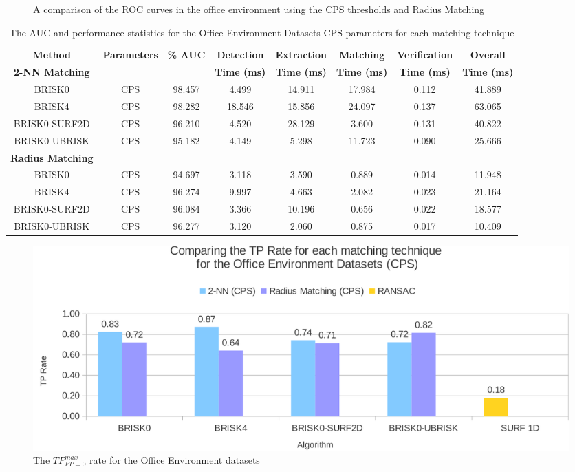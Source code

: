\begin{figure}[ht!]
\begin{minipage}[b]{0.5\linewidth}
\caption{A comparison of the ROC curves in the office environment using the CPS thresholds and Radius Matching}
\label{fig:compareHammingConsistentOffice}
\end{minipage}
\end{figure}

\begin{table}
\centering
\caption{The AUC and performance statistics for the Office Environment Datasets
CPS parameters for each matching technique}

\footnotesize
\begin{tabular}{|c|c|c|c|c|c|c|c|}
\hline 
\textbf{Method } & \textbf{Parameters} & \textbf{\% AUC} & \textbf{Detection} & \textbf{Extraction} & \textbf{Matching} & \textbf{Verification} & \textbf{Overall}\tabularnewline
\textbf{2-NN Matching} &  &  & \textbf{Time (ms)} & \textbf{Time (ms)} & \textbf{Time (ms)} & \textbf{Time (ms)} & \textbf{Time (ms)}\tabularnewline
\hline 
\hline 
BRISK0 & CPS & 98.457 & 4.499 & 14.911 & 17.984 & 0.112 & 41.889\tabularnewline
\hline 
BRISK4 & CPS & 98.282 & 18.546 & 15.856 & 24.097 & 0.137 & 63.065\tabularnewline
\hline 
BRISK0-SURF2D & CPS & 96.210 & 4.520 & 28.129 & 3.600 & 0.131 & 40.822\tabularnewline
\hline 
BRISK0-UBRISK & CPS & 95.182 & 4.149 & 5.298 & 11.723 & 0.090 & 25.666\tabularnewline
\hline 
\hline 
\textbf{Radius Matching} &  &  &  &  &  &  & \tabularnewline
\hline 
BRISK0 & CPS & 94.697 & 3.118 & 3.590 & 0.889 & 0.014 & 11.948\tabularnewline
\hline 
BRISK4 & CPS & 96.274 & 9.997 & 4.663 & 2.082 & 0.023 & 21.164\tabularnewline
\hline 
BRISK0-SURF2D & CPS & 96.084 & 3.366 & 10.196 & 0.656 & 0.022 & 18.577\tabularnewline
\hline 
BRISK0-UBRISK & CPS & 96.277 & 3.120 & 2.060 & 0.875 & 0.017 & 10.409\tabularnewline
\hline 
\end{tabular}
\label{app:oe_hamming}
\end{table}

\begin{figure}
  \centering
    \includegraphics[width=1.0\textwidth]{../Drawings/Graphs/tp_rate_oe_cps.pdf}
    \caption{The $TP_{FP=0}^{max}$ rate for the Office Environment datasets} 
    \label{app:tp_rate_oe}
\end{figure}


